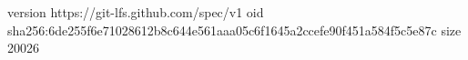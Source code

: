 version https://git-lfs.github.com/spec/v1
oid sha256:6de255f6e71028612b8c644e561aaa05c6f1645a2ccefe90f451a584f5c5e87c
size 20026
